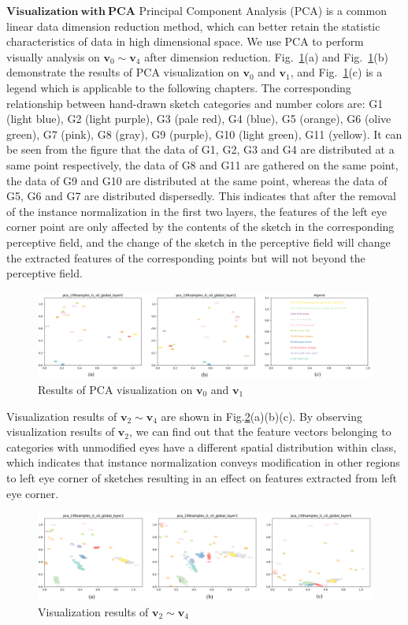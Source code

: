 \documentclass[10pt,twocolumn,letterpaper]{article}
\begin{document}
\noindent
$\mathbf{Visualization ~with ~PCA}$ Principal Component Analysis (PCA)\cite{pca} is a common linear data dimension reduction method, which can better retain the statistic characteristics of data in high dimensional space. We use PCA to perform visually analysis on $\boldsymbol{v}_0\sim \boldsymbol{v}_4$ after dimension reduction.
Fig.~\ref{fig:pca_1}(a) and Fig.~\ref{fig:pca_1}(b) demonstrate the results of PCA visualization on $\boldsymbol{v}_0$ and $\boldsymbol{v}_1$, and Fig.~\ref{fig:pca_1}(c) is a legend which is applicable to the following chapters. The corresponding relationship between hand-drawn sketch categories and number colors are: G1 (light blue), G2 (light purple), G3 (pale red), G4 (blue), G5 (orange), G6 (olive green), G7 (pink), G8 (gray), G9 (purple), G10 (light green), G11 (yellow).
It can be seen from the figure that the data of G1, G2, G3 and G4 are distributed at a same point respectively, the data of G8 and G11 are gathered on the same point, the data of G9 and G10 are distributed at the same point, whereas the data of G5, G6 and G7 are distributed dispersedly. 
This indicates that after the removal of the instance normalization in the first two layers, the features of the left eye corner point are only affected by the contents of the sketch in the corresponding perceptive field, and the change of the sketch in the perceptive field will change the extracted features of the corresponding points but will not beyond the perceptive field.
\begin{figure}[htb]
	\centering
	\includegraphics[width=0.8 \textwidth]{pca_1.png}
	\caption{Results of PCA visualization on $\boldsymbol{v}_0$ and $\boldsymbol{v}_1$}
	\label{fig:pca_1}
\end{figure}
Visualization results of $\boldsymbol{v}_2 \sim \boldsymbol{v}_4$ are shown in Fig.\ref{fig:pca_2}(a)(b)(c). By observing visualization results of $\boldsymbol{v}_2$, we can find out that the feature vectors belonging to categories with unmodified eyes have a different spatial distribution within class, which indicates that instance normalization conveys modification in other regions to left eye corner of sketches resulting in an effect on features extracted from left eye corner. 
\begin{figure}[htb]
	\centering
	\includegraphics[width=0.8 \textwidth]{pca_2.png}
	\caption{Visualization results of $\boldsymbol{v}_2 \sim \boldsymbol{v}_4$}
	\label{fig:pca_2}
\end{figure}
\end{document}
